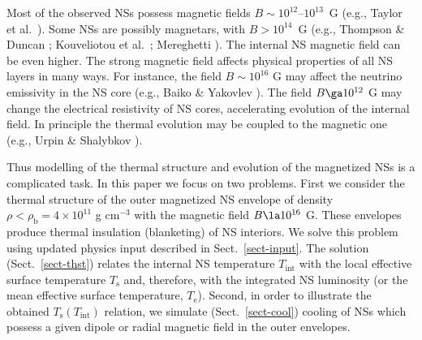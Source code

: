 \documentclass{aa}
\begin{document}
Most of the observed NSs 
possess magnetic fields $B\sim10^{12}$--$10^{13}$~G
(e.g., Taylor et al.\ \cite{tml93}).
Some NSs are possibly magnetars, with $B>10^{14}$~G
(e.g., Thompson \& Duncan \cite{td95};
Kouveliotou et al.\ \cite{kou-ea98,kou-ea99};
Mereghetti \cite{mereghetti01}).
The internal NS magnetic field can be even higher.
The strong magnetic field affects physical
properties of all NS layers in many ways.
For instance, the field $B \sim 10^{16}$ G
may affect the neutrino emissivity in the NS core
(e.g., Baiko \& Yakovlev \cite{by99}). The field $B \ga 10^{12}$ G
may change the electrical resistivity of NS cores,
accelerating evolution of the internal field. In principle
the thermal evolution may be coupled to the
magnetic one (e.g., Urpin \& Shalybkov \cite{us95}).

Thus modelling of the thermal structure
and evolution of the magnetized NSs is a complicated
task. In this paper we focus on two problems.
First we consider the thermal structure of the
outer magnetized NS envelope of density
$\rho < \rho_\mathrm{b} = 4 \times 10^{11}$ g cm$^{-3}$
with the magnetic field $B \la 10^{16}$ G.
These envelopes produce thermal insulation
(blanketing) of NS interiors.
We solve this problem using updated physics
input described in Sect.\ \ref{sect-input}.
The solution (Sect.\ \ref{sect-thst}) relates
the internal NS temperature $T_\mathrm{int}$
with the local effective surface temperature $T_\mathrm{s}$
and, therefore, with the integrated NS luminosity (or
the mean effective surface temperature, $T_\mathrm{e}$). 
Second, in order to illustrate
the obtained $T_\mathrm{s}(T_\mathrm{int})$ relation,
we simulate (Sect.\ \ref{sect-cool})
cooling of NSs which possess a
given dipole or radial magnetic field 
in the outer envelopes.
\end{document}

